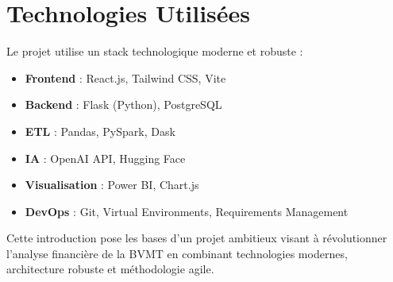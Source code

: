 \section*{Technologies Utilisées}

Le projet utilise un stack technologique moderne et robuste :

\begin{itemize}
    \item \textbf{Frontend} : React.js, Tailwind CSS, Vite
    \item \textbf{Backend} : Flask (Python), PostgreSQL
    \item \textbf{ETL} : Pandas, PySpark, Dask
    \item \textbf{IA} : OpenAI API, Hugging Face
    \item \textbf{Visualisation} : Power BI, Chart.js
    \item \textbf{DevOps} : Git, Virtual Environments, Requirements Management
\end{itemize}

Cette introduction pose les bases d'un projet ambitieux visant à révolutionner l'analyse financière de la BVMT en combinant technologies modernes, architecture robuste et méthodologie agile.
